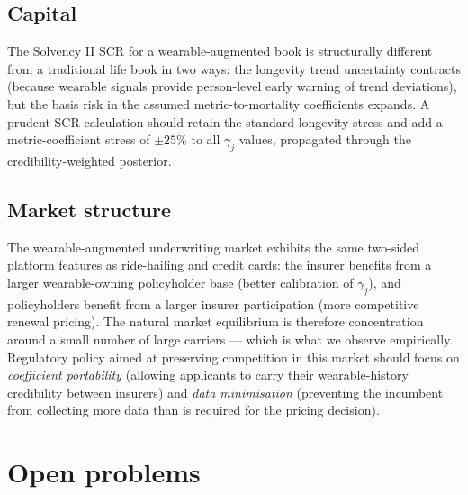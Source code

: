 \subsection{Capital}\label{ss:cap-impl}

The Solvency II SCR for a wearable-augmented book is structurally
different from a traditional life book in two ways: the longevity
trend uncertainty contracts (because wearable signals provide
person-level early warning of trend deviations), but the basis
risk in the assumed metric-to-mortality coefficients expands. A
prudent SCR calculation should retain the standard longevity stress
and add a metric-coefficient stress of $\pm 25\%$ to all
$\gamma_j$ values, propagated through the credibility-weighted
posterior.

\subsection{Market structure}\label{ss:mkt-impl}

The wearable-augmented underwriting market exhibits the same
two-sided platform features as ride-hailing and credit cards: the
insurer benefits from a larger wearable-owning policyholder base
(better calibration of $\gamma_j$), and policyholders benefit from
a larger insurer participation (more competitive renewal pricing).
The natural market equilibrium is therefore concentration around a
small number of large carriers --- which is what we observe
empirically. Regulatory policy aimed at preserving competition in
this market should focus on \emph{coefficient portability}
(allowing applicants to carry their wearable-history credibility
between insurers) and \emph{data minimisation} (preventing the
incumbent from collecting more data than is required for the
pricing decision).

\section{Open problems}\label{sec:open}

